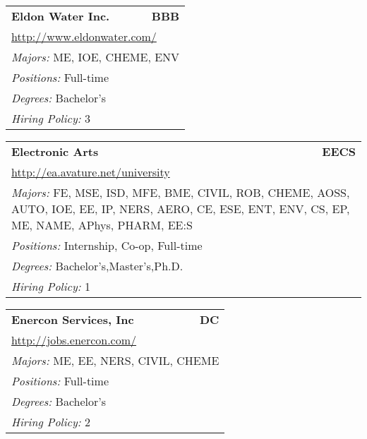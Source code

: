 \documentclass[twoside]{article}
\begin{document}
\begin{center}
\begin{multicols}{3}
\begin{FlushLeft}
\begin{minipage}{.9\columnwidth}
\end{minipage}
 
\begin{minipage}{.9\columnwidth}\begin{tabularx}{.95\columnwidth}{Xr}
                 {\Large\bf Eldon Water Inc.} & {\Large\bf BBB}\\
    \multicolumn{2}{p{.95\columnwidth}}{\url{http://www.eldonwater.com/}}\\
    \multicolumn{2}{p{.95\columnwidth}}{\emph{Majors:} ME, IOE, CHEME, ENV}\\
    \multicolumn{2}{p{.95\columnwidth}}{\emph{Positions:} Full-time}\\
    \multicolumn{2}{p{.95\columnwidth}}{\emph{Degrees:} Bachelor's}\\
    \multicolumn{2}{p{.95\columnwidth}}{\emph{Hiring Policy:} 3}\\
    \end{tabularx}
    
\end{minipage}
 
\begin{minipage}{.9\columnwidth}\begin{tabularx}{.95\columnwidth}{Xr}
                 {\Large\bf Electronic Arts} & {\Large\bf EECS}\\
    \multicolumn{2}{p{.95\columnwidth}}{\url{http://ea.avature.net/university}}\\
    \multicolumn{2}{p{.95\columnwidth}}{\emph{Majors:} FE, MSE, ISD, MFE, BME, CIVIL, ROB, CHEME, AOSS, AUTO, IOE, EE, IP, NERS, AERO, CE, ESE, ENT, ENV, CS, EP, ME, NAME, APhys, PHARM, EE:S}\\
    \multicolumn{2}{p{.95\columnwidth}}{\emph{Positions:} Internship, Co-op, Full-time}\\
    \multicolumn{2}{p{.95\columnwidth}}{\emph{Degrees:} Bachelor's,Master's,Ph.D.}\\
    \multicolumn{2}{p{.95\columnwidth}}{\emph{Hiring Policy:} 1}\\
    \end{tabularx}
    
\end{minipage}
 
\begin{minipage}{.9\columnwidth}\begin{tabularx}{.95\columnwidth}{Xr}
                 {\Large\bf Enercon Services, Inc} & {\Large\bf DC}\\
    \multicolumn{2}{p{.95\columnwidth}}{\url{http://jobs.enercon.com/}}\\
    \multicolumn{2}{p{.95\columnwidth}}{\emph{Majors:} ME, EE, NERS, CIVIL, CHEME}\\
    \multicolumn{2}{p{.95\columnwidth}}{\emph{Positions:} Full-time}\\
    \multicolumn{2}{p{.95\columnwidth}}{\emph{Degrees:} Bachelor's}\\
    \multicolumn{2}{p{.95\columnwidth}}{\emph{Hiring Policy:} 2}\\
    \end{tabularx}
    

\end{minipage}
\end{FlushLeft}
\end{multicols}
\end{center}
\end{document}
